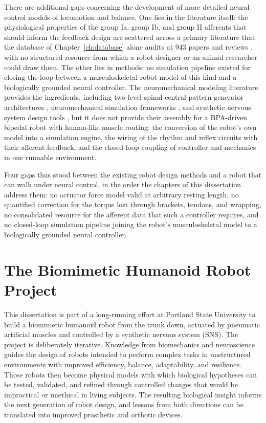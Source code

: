 There are additional gaps concerning the development of more detailed neural control models of locomotion and balance. One lies in the literature itself: the physiological properties of the group Ia, group Ib, and group II afferents that should inform the feedback design are scattered across a primary literature that the database of Chapter~\ref{ch:database} alone audits at 943 papers and reviews \citep{van_de_crommert_review_1998, windhorst_muscle_2007, windhorst_spinal_2022}, with no structured resource from which a robot designer or an animal researcher could draw them. The other lies in methods: no simulation pipeline existed for closing the loop between a musculoskeletal robot model of this kind and a biologically grounded neural controller. The neuromechanical modeling literature provides the ingredients, including two-level spinal central pattern generator architectures \citep{rybak_modelling_2006, mccrea_organization_2008}, neuromechanical simulation frameworks \citep{markin_afferent_2010}, and synthetic nervous system design tools \citep{nourse_sns_2023}, but it does not provide their assembly for a BPA-driven bipedal robot with human-like muscle routing: the conversion of the robot's own model into a simulation engine, the wiring of the rhythm and reflex circuits with their afferent feedback, and the closed-loop coupling of controller and mechanics in one runnable environment.

Four gaps thus stood between the existing robot design methods and a robot that can walk under neural control, in the order the chapters of this dissertation address them: no actuator force model valid at arbitrary resting length, no quantified correction for the torque lost through brackets, tendons, and wrapping, no consolidated resource for the afferent data that such a controller requires, and no closed-loop simulation pipeline joining the robot's musculoskeletal model to a biologically grounded neural controller.

\section{The Biomimetic Humanoid Robot Project}\label{sec:project}

This dissertation is part of a long-running effort at Portland State University to build a biomimetic humanoid robot from the trunk down, actuated by pneumatic artificial muscles and controlled by a synthetic nervous system (SNS). The project is deliberately iterative. Knowledge from biomechanics and neuroscience guides the design of robots intended to perform complex tasks in unstructured environments with improved efficiency, balance, adaptability, and resilience. Those robots then become physical models with which biological hypotheses can be tested, validated, and refined through controlled changes that would be impractical or unethical in living subjects. The resulting biological insight informs the next generation of robot design, and lessons from both directions can be translated into improved prosthetic and orthotic devices.

